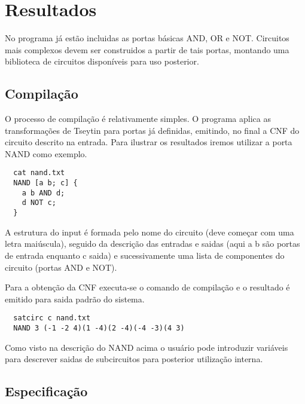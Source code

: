 \section{Resultados}
\label{sec:resultados}

No programa já estão incluidas as portas básicas AND, OR e NOT. Circuitos mais
complexos devem ser construidos a partir de tais portas, montando uma
biblioteca de circuitos disponíveis para uso posterior.

\subsection{Compilação}
\label{sec:compilacao}

O processo de compilação é relativamente simples. O programa aplica as
transformações de Tseytin para portas já definidas, emitindo, no final
a CNF do circuito descrito na entrada. Para ilustrar os resultados
iremos utilizar a porta NAND como exemplo.
\begin{lstlisting}
  cat nand.txt
  NAND [a b; c] {
    a b AND d;
    d NOT c;
  }
\end{lstlisting}
A estrutura do input é formada pelo nome do circuito (deve começar com uma
letra maiúscula), seguido da descrição das entradas e saidas (aqui a b são
portas de entrada enquanto c saida) e sucessivamente uma lista de componentes
do circuito (portas AND e NOT).

Para a obtenção da CNF executa-se o comando de compilação e o resultado é
emitido para saida padrão do sistema.
\begin{lstlisting}
  satcirc c nand.txt
  NAND 3 (-1 -2 4)(1 -4)(2 -4)(-4 -3)(4 3)
\end{lstlisting}
Como visto na descrição do NAND acima o usuário pode introduzir variáveis
para descrever saidas de subcircuitos para posterior utilização interna.

\subsection{Especificação}
\label{sec:espec}

